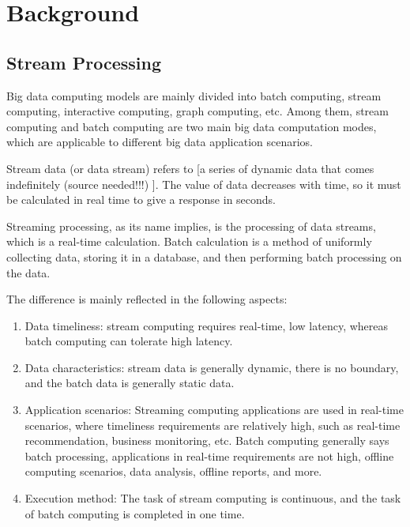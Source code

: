 \documentclass[pdftex,twocolumn,10pt,letterpaper]{article}
\begin{document}



\section{Background}

\subsection{Stream Processing}
Big data computing models are mainly divided into batch computing, stream computing, interactive computing, graph computing, etc. Among them, stream computing and batch computing are two main big data computation modes, which are applicable to different big data application scenarios. 

Stream data (or data stream) refers to [a series of dynamic data that comes indefinitely (source needed!!!) ]. The value of data decreases with time, so it must be calculated in real time to give a response in seconds. 

Streaming processing, as its name implies, is the processing of data streams, which is a real-time calculation. Batch calculation is a method of uniformly collecting data, storing it in a database, and then performing batch processing on the data. 

The difference is mainly reflected in the following aspects: 

\begin{enumerate}
\item Data timeliness: stream computing requires real-time, low latency, whereas batch computing can tolerate high latency. 

\item Data characteristics: stream data is generally dynamic, there is no boundary, and the batch data is generally static data. 

\item Application scenarios: Streaming computing applications are used in real-time scenarios, where timeliness requirements are relatively high, such as real-time recommendation, business monitoring, etc. Batch computing generally says batch processing, applications in real-time requirements are not high, offline computing scenarios, data analysis, offline reports, and more. 

\item Execution method: The task of stream computing is continuous, and the task of batch computing is completed in one time.
\end{enumerate}
\end{document}
